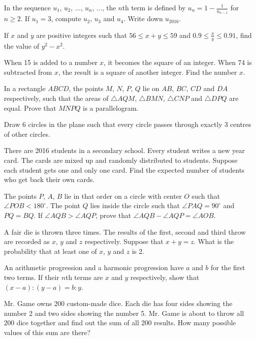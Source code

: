 \begin{problems}
    \problem In the sequence $u_{1}$, $u_{2}$, $\ldots$, $u_{n}$, $\ldots$, the
    $n$th term is defined by $u_{n} = 1 - \frac{1}{u_{n - 1}}$ for $n \geq 2$.
    If $u_{1} = 3$, compute $u_{2}$, $u_{3}$ and $u_{4}$. Write down
    $u_{2016}$.  
    
    \problem If $x$ and $y$ are positive integers such that $56 \leq x + y \leq
    59$ and $0.9 \leq \frac{x}{y} \leq 0.91$, find the value of $y^2 - x^2$. 
    
    \problem When 15 is added to a number $x$, it becomes the square of an
    integer. When 74 is subtracted from $x$, the result is a square of another
    integer. Find the number $x$. 
    
    \problem In a rectangle $ABCD$, the points $M$, $N$, $P$, $Q$ lie on $AB$,
    $BC$, $CD$ and $DA$ respectively, such that the areas of $\triangle AQM$,
    $\triangle BMN$, $\triangle CNP$ and $\triangle DPQ$ are equal. Prove that
    $MNPQ$ is a parallelogram.
    
    \problem Draw 6 circles in the plane such that every circle passes through
    exactly 3 centres of other circles. 
    
    \problem There are 2016 students in a secondary school. Every student
    writes a new year card. The cards are mixed up and randomly distributed to
    students. Suppose each student gets one and only one card. Find the
    expected number of students who get back their own cards. 
    
    \problem The points $P$, $A$, $B$ lie in that order on a circle with center
    $O$ such that $\angle POB < 180^\circ$. The point $Q$ lies inside the
    circle such that $\angle PAQ = 90^\circ$ and $PQ = BQ$. If $\angle AQB >
    \angle AQP$, prove that $\angle AQB - \angle AQP = \angle AOB$. 
    
    \problem A fair die is thrown three times. The results of the first, second
    and third throw are recorded as $x$, $y$ and $z$ respectively. Suppose that
    $x + y = z$. What is the probability that at least one of $x$, $y$ and $z$
    is 2. 
    
    \problem An arithmetic progression and a harmonic progression have $a$ and
    $b$ for the first two terms. If their $n$th terms are $x$ and $y$
    respectively, show that $(x - a) : (y - a) = b : y$. 
    
    \problem Mr. Game owns 200 custom-made dice. Each die has four sides
    showing the number 2 and two sides showing the number 5. Mr. Game is about
    to throw all 200 dice together and find out the sum of all 200 results. How
    many possible values of this sum are there?
    

\end{problems}
